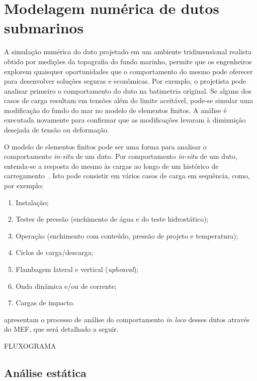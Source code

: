 \section{Modelagem numérica de dutos submarinos}\label{chap:assentamento}


A simulação numérica do duto projetado em um ambiente tridimensional realista obtido por medições da topografia do fundo marinho, permite que os engenheiros explorem quaisquer oportunidades que o comportamento do mesmo pode oferecer para desenvolver soluções seguras e econômicas. %
Por exemplo, o projetista pode analisar primeiro o comportamento do duto na batimetria original.
Se alguns dos casos de carga resultam em tensões além do limite aceitável, pode-se simular uma modificação do fundo do mar no modelo de elementos finitos.
A análise é executada novamente para confirmar que as modificações levaram à diminuição desejada de tensão ou deformação.

O modelo de elementos finitos pode ser uma forma para analisar o comportamento \textit{in-situ} de um duto.
Por comportamento \textit{in-situ} de um duto, entenda-se a resposta do mesmo às cargas ao longo de um histórico de carregamento~\cite{Bai2014}. Isto pode consistir em vários casos de carga em sequência, como, por exemplo:

\begin{enumerate}
    \item Instalação;
    \item Testes de pressão (enchimento de água e do teste hidrostático);
    \item Operação (enchimento com conteúdo, pressão de projeto e temperatura);
    \item Ciclos de carga/descarga;
    \item Flambagem lateral e vertical (\textit{upheaval});
    \item Onda dinâmica e/ou de corrente;
    \item Cargas de impacto.
\end{enumerate}

 apresentam o processo de análise do comportamento \textit{in loco} desses dutos através do MEF, que será detalhado a seguir.

FLUXOGRAMA

\subsection{Análise estática}


